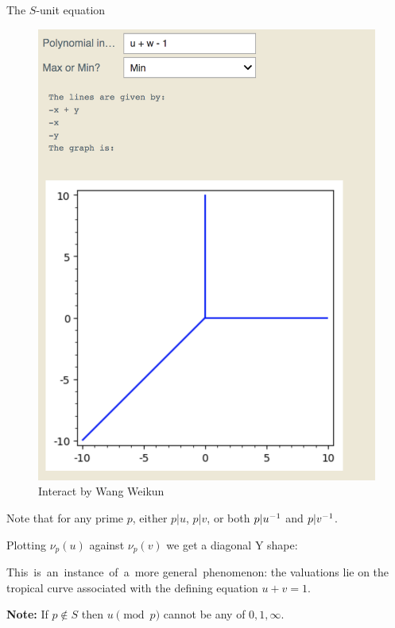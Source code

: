 \begin{frame}{The $S$-unit equation}
    \begin{figure}
        \vspace{-25pt}
        \includegraphics[width=\textwidth]{wang2}
        \caption*{Interact by Wang Weikun}
    \end{figure}
    Note that for any prime $p$, either $p|u$, $p|v$, or both $p|u^{-1}$ and $p|v^{-1}$.

    Plotting $\nu_p(u)$ against $\nu_p(v)$ we get a diagonal Y shape:\pause

    This~is~an~instance~of~a~more general~phenomenon: the valuations lie on the tropical curve associated with the defining equation $u+v=1$.

    \textbf{Note:} If $p \not\in S$ then $u\pmod p$ cannot be any of $0, 1, \infty $.

\end{frame}

